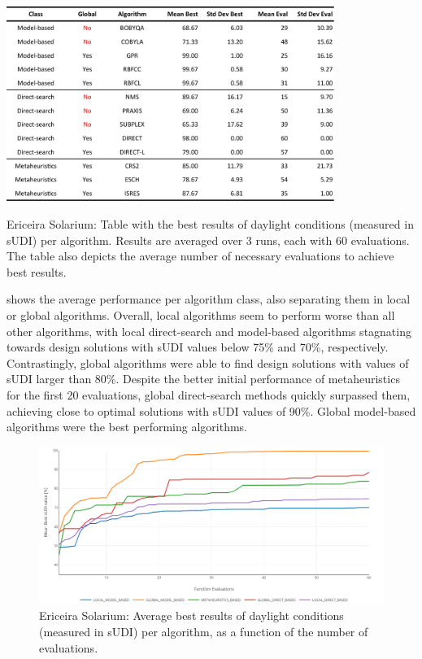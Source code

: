 \begin{table}[htbp]
	\centering
	\includegraphics[width=0.8\textwidth]{tables_and_code/Ericeira_phase1_stats_v1.pdf}
	\caption[Ericeira Solarium: Table with best results and necessary evaluations per algorithm]{Ericeira Solarium: Table with the best results of daylight conditions (measured in \ac{sUDI}) per algorithm. Results are averaged over 3 runs, each with 60 evaluations. The table also depicts the average number of necessary evaluations to achieve best results.}
	\label{table:phase1results}
\end{table}

 shows the average performance per algorithm class, also separating them in local or global algorithms. Overall, local algorithms seem to perform worse than all other algorithms, with local direct-search and model-based algorithms stagnating towards design solutions with sUDI values below 75\% and 70\%, respectively. Contrastingly, global algorithms were able to find design solutions with values of sUDI larger than 80\%. Despite the better initial performance of metaheuristics for the first 20 evaluations, global direct-search methods quickly surpassed them, achieving close to optimal solutions with \ac{sUDI} values of 90\%. Global model-based algorithms were the best performing algorithms. 

\begin{figure}[htbp]
	\centering
	\includegraphics[width=1\textwidth]{Images/Evaluation/Ericeira_results_ph1_per_class.PNG}
	\caption[Ericeira Solarium: Average best results of daylight conditions (measured in \ac{sUDI}) per algorithm's class]{Ericeira Solarium: Average best results of daylight conditions (measured in \ac{sUDI}) per algorithm, as a function of the number of evaluations.}
	\label{fig:phase1results}
\end{figure}

